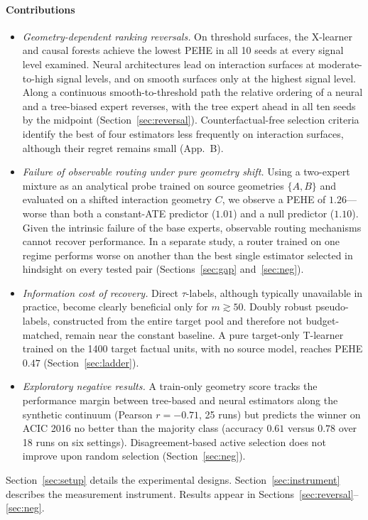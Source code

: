 \documentclass[pdflatex,sn-mathphys-num]{sn-jnl}
\begin{document}
\paragraph{Contributions}
\begin{itemize}
  \item \emph{Geometry-dependent ranking reversals.} On threshold surfaces, the X-learner and causal forests achieve the lowest PEHE in all 10 seeds at every signal level examined. Neural architectures lead on interaction surfaces at moderate-to-high signal levels, and on smooth surfaces only at the highest signal level. Along a continuous smooth-to-threshold path the relative ordering of a neural and a tree-biased expert reverses, with the tree expert ahead in all ten seeds by the midpoint (Section~\ref{sec:reversal}). Counterfactual-free selection criteria identify the best of four estimators less frequently on interaction surfaces, although their regret remains small (App.~B).
  \item \emph{Failure of observable routing under pure geometry shift.} Using a two-expert mixture as an analytical probe trained on source geometries $\{A,B\}$ and evaluated on a shifted interaction geometry $C$, we observe a PEHE of $1.26$—worse than both a constant-ATE predictor ($1.01$) and a null predictor ($1.10$). Given the intrinsic failure of the base experts, observable routing mechanisms cannot recover performance. In a separate study, a router trained on one regime performs worse on another than the best single estimator selected in hindsight on every tested pair (Sections~\ref{sec:gap} and~\ref{sec:neg}).
  \item \emph{Information cost of recovery.} Direct $\tau$-labels, although typically unavailable in practice, become clearly beneficial only for $m\gtrsim 50$. Doubly robust pseudo-labels, constructed from the entire target pool and therefore not budget-matched, remain near the constant baseline. A pure target-only T-learner trained on the 1400 target factual units, with no source model, reaches PEHE $0.47$ (Section~\ref{sec:ladder}).
  \item \emph{Exploratory negative results.} A train-only geometry score tracks the performance margin between tree-based and neural estimators along the synthetic continuum (Pearson $r=-0.71$, 25 runs) but predicts the winner on ACIC 2016 \citep{dorie2019} no better than the majority class (accuracy $0.61$ versus $0.78$ over 18 runs on six settings). Disagreement-based active selection does not improve upon random selection (Section~\ref{sec:neg}).
\end{itemize}
Section~\ref{sec:setup} details the experimental designs. Section~\ref{sec:instrument} describes the measurement instrument. Results appear in Sections~\ref{sec:reversal}--\ref{sec:neg}.
\end{document}
